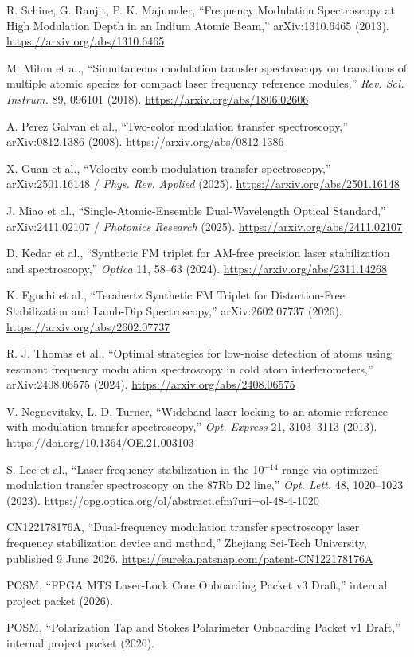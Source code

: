 \documentclass[10pt]{article}
\begin{document}
\begin{enumerate}[label={[\arabic*]},leftmargin=2.0em]
\item R. Schine, G. Ranjit, P. K. Majumder, ``Frequency Modulation Spectroscopy at High Modulation Depth in an Indium Atomic Beam,'' arXiv:1310.6465 (2013). \url{https://arxiv.org/abs/1310.6465}
\item M. Mihm et al., ``Simultaneous modulation transfer spectroscopy on transitions of multiple atomic species for compact laser frequency reference modules,'' \emph{Rev. Sci. Instrum.} 89, 096101 (2018). \url{https://arxiv.org/abs/1806.02606}
\item A. Perez Galvan et al., ``Two-color modulation transfer spectroscopy,'' arXiv:0812.1386 (2008). \url{https://arxiv.org/abs/0812.1386}
\item X. Guan et al., ``Velocity-comb modulation transfer spectroscopy,'' arXiv:2501.16148 / \emph{Phys. Rev. Applied} (2025). \url{https://arxiv.org/abs/2501.16148}
\item J. Miao et al., ``Single-Atomic-Ensemble Dual-Wavelength Optical Standard,'' arXiv:2411.02107 / \emph{Photonics Research} (2025). \url{https://arxiv.org/abs/2411.02107}
\item D. Kedar et al., ``Synthetic FM triplet for AM-free precision laser stabilization and spectroscopy,'' \emph{Optica} 11, 58--63 (2024). \url{https://arxiv.org/abs/2311.14268}
\item K. Eguchi et al., ``Terahertz Synthetic FM Triplet for Distortion-Free Stabilization and Lamb-Dip Spectroscopy,'' arXiv:2602.07737 (2026). \url{https://arxiv.org/abs/2602.07737}
\item R. J. Thomas et al., ``Optimal strategies for low-noise detection of atoms using resonant frequency modulation spectroscopy in cold atom interferometers,'' arXiv:2408.06575 (2024). \url{https://arxiv.org/abs/2408.06575}
\item V. Negnevitsky, L. D. Turner, ``Wideband laser locking to an atomic reference with modulation transfer spectroscopy,'' \emph{Opt. Express} 21, 3103--3113 (2013). \url{https://doi.org/10.1364/OE.21.003103}
\item S. Lee et al., ``Laser frequency stabilization in the 10$^{-14}$ range via optimized modulation transfer spectroscopy on the 87Rb D2 line,'' \emph{Opt. Lett.} 48, 1020--1023 (2023). \url{https://opg.optica.org/ol/abstract.cfm?uri=ol-48-4-1020}
\item CN122178176A, ``Dual-frequency modulation transfer spectroscopy laser frequency stabilization device and method,'' Zhejiang Sci-Tech University, published 9 June 2026. \url{https://eureka.patsnap.com/patent-CN122178176A}
\item POSM, ``FPGA MTS Laser-Lock Core Onboarding Packet v3 Draft,'' internal project packet (2026).
\item POSM, ``Polarization Tap and Stokes Polarimeter Onboarding Packet v1 Draft,'' internal project packet (2026).
\end{enumerate}
\end{document}
